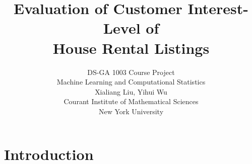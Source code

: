 \documentclass{article}
\begin{document}
{
\title{\bf Evaluation of Customer Interest-Level of \\
House Rental Listings \vspace{0.25em}}
\author{
        DS-GA 1003 Course Project \vspace{0.5em}\\
        Machine Learning and Computational Statistics  \vspace{2.0em}\\
        Xialiang Liu, Yihui Wu  \vspace{0.75em}\\
        Courant Institute of Mathematical Sciences \vspace{0.5em}\\
        New York University \\ 
\date{}
}

\maketitle
}




\section{Introduction} \label{intro}
\end{document}
